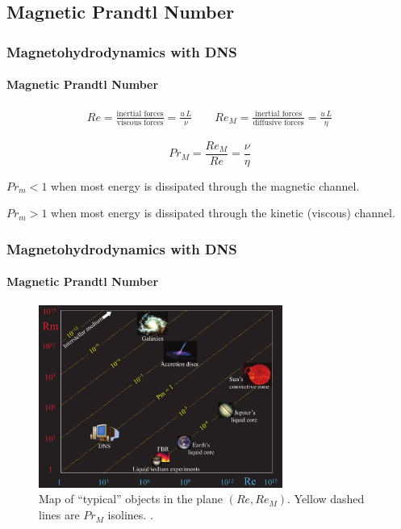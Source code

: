 \documentclass{beamer}
\begin{document}
\subsection{Magnetic Prandtl Number}

\begin{frame}
 \frametitle{Magnetohydrodynamics with DNS}
 \framesubtitle{Magnetic Prandtl Number}
 
 \begin{align}
 Re = \frac{\text{inertial forces}}{\text{viscous forces}} =  \frac{u\,L}{\nu} \nonumber \qquad
 Re_M = \frac{\text{inertial forces}}{\text{diffusive forces}} =  \frac{u\,L}{\eta} \nonumber
 \end{align}\pause
 
 \begin{equation}
  Pr_M = \frac{Re_M}{Re} =  \frac{\nu}{\eta}
 \end{equation} \pause
 
 $Pr_m < 1$ when most energy is dissipated through the magnetic channel.
 
 $Pr_m > 1$ when most energy is dissipated through the kinetic (viscous) channel.
 
\end{frame}

\begin{frame}
 \frametitle{Magnetohydrodynamics with DNS}
 \framesubtitle{Magnetic Prandtl Number}
 
 \begin{figure}[t]
  \includegraphics[width=8cm]{img/PrM_spectrum}
  \caption{Map of ``typical'' objects in the plane $(Re,Re_M)$. Yellow dashed lines are $Pr_M$ isolines. \cite{plunian2013shell}.}
  \centering
 \end{figure}
 
 
 
 
 
\end{frame}
\end{document}
